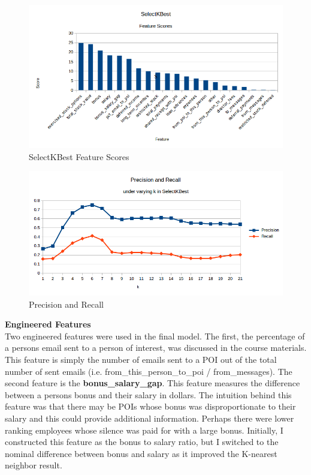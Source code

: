 \documentclass[a4paper,11pt]{report}
\begin{document}
\begin{figure}[!h]
    \centering
    \includegraphics[scale=.6]{feature_scores.png}
    \caption{SelectKBest Feature Scores}
\end{figure}

\begin{figure}[!h]
    \centering
    \includegraphics[scale=.6]{precision_recall.png}
    \caption{Precision and Recall}
\end{figure}

\textbf{Engineered Features} \\

Two engineered features were used in the final model.  The first, the percentage
of a persons email sent to a person of interest, was discussed in the course
materials.  This feature is simply the number of emails sent to a POI out of the
total number of sent emails (i.e. from\_this\_person\_to\_poi / from\_messages).  The
second feature is the \textbf{bonus\_salary\_gap}.  This feature measures the
difference between a persons bonus and their salary in dollars.  The intuition behind this
feature was that there may be POIs whose bonus was disproportionate to their
salary and this could provide additional information.  Perhaps there were lower
ranking employees whose silence was paid for with a large bonus.  Initially, I
constructed this feature as the bonus to salary ratio, but I switched to the
nominal difference between bonus and salary as it improved the K-nearest
neighbor result. \\
\end{document}
